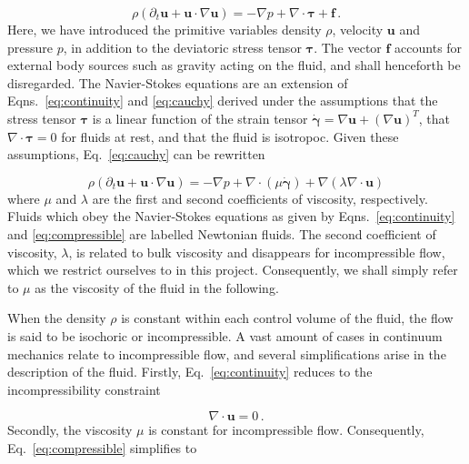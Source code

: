 \documentclass[final,3p,twocolumn]{elsarticle}
\begin{document}
\begin{equation}
    \rho \left( \partial_t \bm{u} + \bm{u} \cdot \nabla \bm{u} \right) 
    = - \nabla p + \nabla \cdot \bm{\tau} + \bm{f} \,.
    \label{eq:cauchy}
\end{equation}
%
Here, we have introduced the primitive variables density $\rho$, velocity
$\bm{u}$ and pressure $p$, in addition to the deviatoric stress tensor
$\bm{\tau}$. The vector $\bm{f}$ accounts for external body sources such as
gravity acting on the fluid, and shall henceforth be disregarded. The
Navier-Stokes equations are an extension of Eqns.\ \eqref{eq:continuity} and
\eqref{eq:cauchy} derived under the assumptions that the stress tensor
$\bm{\tau}$ is a linear function of the strain tensor $\dot{\bm{\gamma}}=\nabla
\bm{u} + (\nabla \bm{u})^T$, that $\nabla \cdot \bm{\tau} = 0$ for fluids at
rest, and that the fluid is isotropoc. Given these assumptions, Eq.\
\eqref{eq:cauchy} can be rewritten

\begin{equation}
    \rho \left( \partial_t \bm{u} + \bm{u} \cdot \nabla \bm{u} \right) 
    = - \nabla p + \nabla \cdot \left( \mu \dot{\bm{\gamma}} \right) + \nabla
    \left( \lambda \nabla \cdot \bm{u} \right)
    \label{eq:compressible}
\end{equation}
%
where $\mu$ and $\lambda$ are the first and second coefficients of viscosity,
respectively. Fluids which obey the Navier-Stokes equations as given by Eqns.\
\eqref{eq:continuity} and \eqref{eq:compressible} are labelled Newtonian
fluids.  The second coefficient of viscosity, $\lambda$, is related to bulk
viscosity and disappears for incompressible flow, which we restrict ourselves
to in this project. Consequently, we shall simply refer to $\mu$ as the
viscosity of the fluid in the following. 

When the density $\rho$ is constant within each control volume of the fluid,
the flow is said to be isochoric or incompressible. A vast amount of cases in
continuum mechanics relate to incompressible flow, and several simplifications
arise in the description of the fluid. Firstly, Eq.\ \eqref{eq:continuity}
reduces to the incompressibility constraint

\begin{equation}
    \nabla \cdot \bm{u} = 0 \,.
    \label{eq:incompressibility}
\end{equation}
%
Secondly, the viscosity $\mu$ is constant for incompressible flow.
Consequently, Eq.\ \eqref{eq:compressible} simplifies to 
\end{document}
